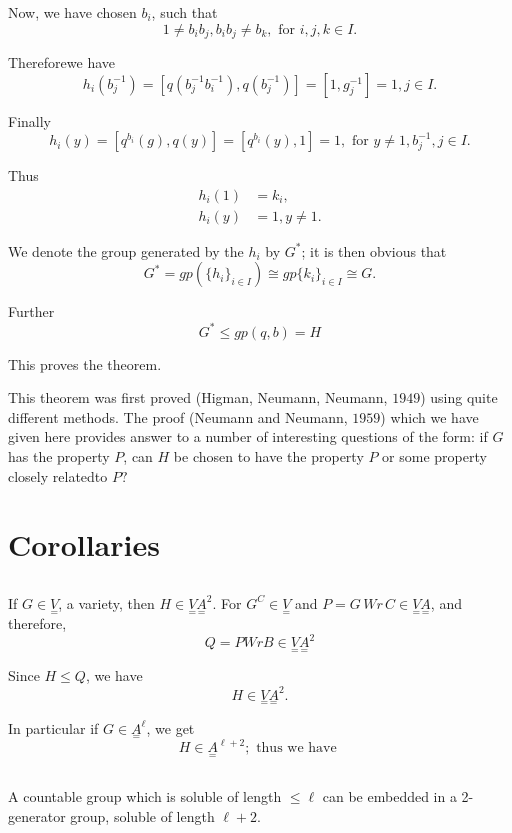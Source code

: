 Now, we have chosen $b_i$, such that 
$$
1 \neq b_i b_j, b_i b_j \neq b_k, \text{ for } i,j,k \in I.
$$

Therefore\pageoriginale we have
$$
h_i (b_j^{-1}) = [q (b_j^{-1} b_i^{-1}), q(b_j^{-1})] = [1,g_j^{-1}] =
1, j \in I. 
$$

Finally
$$
h_i (y) = [q^{b_i} (g), q (y)] = [q^{b_i} (y), 1] = 1, \text{ for } y
\neq 1, b_j ^{-1}, j \in I. 
$$

Thus
\begin{align*}
  h_i (1) & = k_i,\\
  h_i (y) & = 1, y \neq 1.
\end{align*}
 
 We denote the group generated by the $h_i$ by $G^*$; it is then obvious that
 $$
 G^* = gp (\{ h_i\}_{i \in I}) \cong gp \{k_i\}_{i \in I} \cong G.
 $$
 
 Further
 $$
 G^* \le gp (q,b) = H
 $$
 
 This proves the theorem.
 
 This theorem was first proved (Higman, Neumann, Neumann, $1949$)
 using quite different methods. The proof (Neumann and Neumann,
 $1959$) which we have given here provides answer to a number of
 interesting questions of the form: if $G$ has the property $P$, can
 $H$ be chosen to have the property $P$ or some property closely
 related\pageoriginale to $P ?$  
 
 \section{Corollaries}\label{chap8:sec2}%

\subsection{}\label{chap8:sec2:subsec1} 
If $G \in \underset{=}{V}$, a variety, then $H
   \in \underset{=}{V} \underset{=}{A}^2$. For $G^C
   \in \underset{=}{V}$ and $P = G \,Wr\, C \in
   \underset{=}{V} \underset{=}{A}$, and therefore, 
   $$
   Q = P Wr B \in \underset{=}{V} \underset{=}{A}^2
   $$

   Since $H \le Q$, we have
   $$
   H \in \underset{=}{V} \underset{=}{A}^2.
   $$
   
   In particular if $G \in \underset{=}{A}^\ell$, we get
   $$
   H \in \underset{=}{A}^{\ell + 2}; \text{ thus we have }
   $$
 
\subsection{}\label{chap8:sec2:subsec2} 
A countable group which is soluble of length
$\le \ell$ can be    embedded in a 2-generator group, soluble of
length $\ell + 2$.  
 
